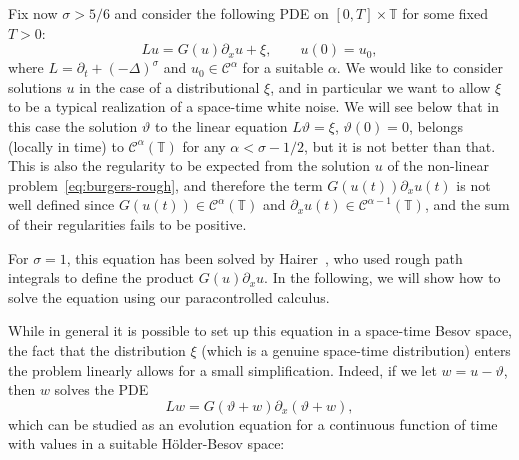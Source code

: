 \documentclass[11pt,a4paper]{article}
\theoremstyle{remark}
\newcommand{\CC}{\ensuremath{\mathscr{C}}}
\begin{document}
Fix now $\sigma > 5/6$ and consider the following PDE on $[ 0,T ] \times \mathbb{T}$ for some fixed $T>0$:
\begin{equation}\label{eq:burgers-rough}
  L u=G ( u ) \partial_{x} u+ \xi, \qquad u(0) = u_0,
\end{equation}
where $L= \partial_{t} + ( - \Delta )^{\sigma}$ and $u_0 \in \CC^\alpha$ for a suitable $\alpha$. We would like to consider solutions $u$ in the case of a
distributional $\xi$, and in particular we want to allow $\xi$ to be a typical
realization of a space-time white noise. We will see below that in this case
the solution $\vartheta$ to the linear equation $L  \vartheta = \xi$,
$\vartheta ( 0 ) =0$, belongs (locally in time) to $\CC^{\alpha} ( \mathbb{T})$ for any $\alpha < \sigma -1/2$, but it is not better than that. This is
also the regularity to be expected from the solution $u$ of the non-linear
problem~{\eqref{eq:burgers-rough}}, and therefore the term $G ( u ( t ) ) \partial_{x} u ( t )$ is not well defined since $G ( u ( t ) ) \in \CC^{\alpha} ( \mathbb{T} )$ and $\partial_{x} u ( t ) \in \CC^{\alpha -1} (\mathbb{T} )$, and the sum of their regularities fails to be positive.

For $\sigma =1$, this equation has been solved by
Hairer~{\cite{Hairer2011}}, who used rough path integrals to define the
product $G ( u ) \partial_{x} u$. In the following, we will show how to solve
the equation using our paracontrolled calculus.



While in general it is possible to set up this equation in a space-time Besov
space, the fact that the distribution $\xi$ (which is a genuine space-time
distribution) enters the problem linearly allows for a small simplification.
Indeed, if we let $w=u- \vartheta$, then $w$ solves the PDE
\begin{equation}\label{eq:burgers-alt}
  L w=G ( \vartheta +w ) \partial_{x} ( \vartheta +w ),
\end{equation}
which can be studied as an evolution equation for a continuous function of
time with values in a suitable H{\"o}lder-Besov space:
\end{document}
